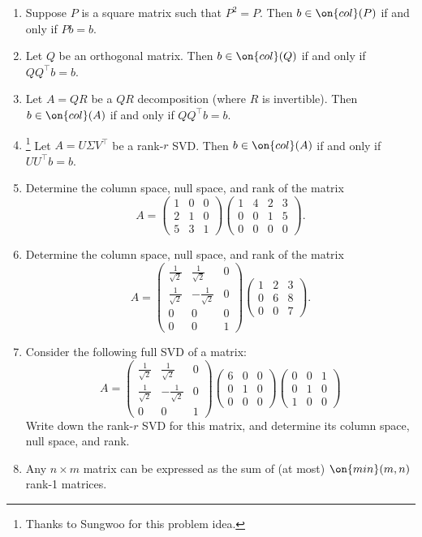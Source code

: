 \documentclass[10pt]{amsart}
\theoremstyle{mythm}
\theoremstyle{definition}
\theoremstyle{myrmk}
\begin{document}
\begin{enumerate}[label=(\arabic*), itemsep = 0.6in]
{		}
		\item Suppose $P$ is a square matrix such that $P^2 = P$. Then $b \in \on{col}(P)$ if and only if $Pb = b$. 
		\item Let $Q$ be an orthogonal matrix. Then $b \in \on{col}(Q)$ if and only if $QQ^\top b = b$. 
		\item Let $A = QR$ be a $QR$ decomposition (where $R$ is invertible). Then $b \in \on{col}(A)$ if and only if $Q Q^\top b = b$. 
		\item\footnote{Thanks to Sungwoo for this problem idea.} Let $A = U\Sigma V^\top$ be a rank-$r$ SVD. Then $b \in \on{col}(A)$ if and only if $UU^\top b = b$. 
		\item Determine the column space, null space, and rank of the matrix 
		\[
			A = \begin{pmatrix}
			1 & 0 & 0 \\ 2 & 1 & 0 \\ 5 & 3 & 1
			\end{pmatrix}
			\begin{pmatrix}
			1 & 4 & 2 & 3 \\ 0 & 0 & 1 & 5 \\ 0 & 0 & 0 & 0
			\end{pmatrix}. 
		\]
		\item Determine the column space, null space, and rank of the matrix 
		\[
			A = \begin{pmatrix}
			\frac{1}{\sqrt2} & \frac{1}{\sqrt2}  & 0 \\ 
			\frac{1}{\sqrt2} & -\frac{1}{\sqrt2}  & 0 \\
			0 & 0 & 0 \\
			0 & 0 & 1 
			\end{pmatrix} \begin{pmatrix}
			1 & 2 & 3 \\ 
			0 & 6 & 8 \\
			0 & 0 & 7
			\end{pmatrix}. 
		\]
		
		\item Consider the following full SVD of a matrix:  
		\[
			A = \begin{pmatrix}
			\frac{1}{\sqrt2} & \frac{1}{\sqrt2}  & 0 \\ 
			\frac{1}{\sqrt2} & -\frac{1}{\sqrt2}  & 0 \\
			0 & 0 & 1
			\end{pmatrix}
			\begin{pmatrix}
				6 & 0 & 0 \\
				0 & 1 & 0 \\
				0 & 0 & 0 
			\end{pmatrix}
			\begin{pmatrix}
				0 & 0 & 1 \\
				0 & 1 & 0 \\
				1 & 0 & 0 
			\end{pmatrix}
		\]
		Write down the rank-$r$ SVD for this matrix, and determine its column space, null space, and rank.
		\item Any $n \times m$ matrix can be expressed as the sum of (at most) $\on{min}(m, n)$ rank-1 matrices. 
	\end{enumerate}
	
\end{document}
